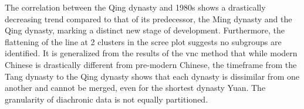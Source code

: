 The correlation between the Qing dynasty and 1980s shows a drastically decreasing trend compared to that of its predecessor, the Ming dynasty and the Qing dynasty, marking a distinct new stage of development. Furthermore, the flattening of the line at 2 clusters in the scree plot suggests no subgroups are identified. It is generalized from the results of the \gls{vnc} method that while modern Chinese is drastically different from pre-modern Chinese, the timeframe from the Tang dynasty to the Qing dynasty shows that each dynasty is dissimilar from one another and cannot be merged, even for the shortest dynasty Yuan. The granularity of diachronic data is not equally partitioned.


